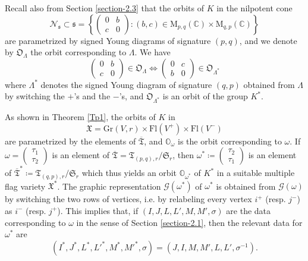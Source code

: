 \documentclass[ALCO,Unicode]{cedram}
\newcommand{\fs}{\mathfrak{s}}
\newcommand{\Mat}{\mathrm{M}}
\newcommand{\Xorbit}{\mathbb{O}}
\newcommand{\Nsorbit}{\mathfrak{O}}
\newcommand{\nilpotentsof}[1]{\mathcal{N}_{#1}}
\newcommand{\permutationsof}[1]{\mathfrak{S}_{#1}}
\newcommand{\ppermutationsof}{\mathfrak{T}}
\newcommand{\parameters}{\overline{\ppermutationsof}}
\newcommand{\Xfv}{\mathfrak{X}}
\newcommand{\Grass}{\mathrm{Gr}}
\newcommand{\Flags}{\mathrm{Fl}}
\newcommand{\mC}{\mathbb{C}}
\begin{document}
Recall also from Section \ref{section-2.3} that the orbits of $K$ in the nilpotent cone
\[
\nilpotentsof{\fs}\subset\fs=\left\{\begin{pmatrix} 0 & b\\ c & 0 \end{pmatrix}: (b,c)\in \Mat_{p,q}(\mC)\times\Mat_{q,p}(\mC)\right\}
\]
are parametrized by signed Young diagrams of signature $(p,q)$, and we denote by $\Nsorbit_\Lambda$ the orbit corresponding to $\Lambda$. We have
\begin{equation}
\label{4.6}
\begin{pmatrix} 0 & b\\ c & 0 \end{pmatrix}\in\Nsorbit_\Lambda\Longleftrightarrow \begin{pmatrix} 0 & c\\ b & 0 \end{pmatrix}\in\Nsorbit_{\Lambda^*}
\end{equation}
where $\Lambda^*$ denotes the signed Young diagram of signature $(q,p)$ obtained from $\Lambda$ by switching the $+$'s and the $-$'s, and $\Nsorbit_{\Lambda^*}$ is an orbit of the group $K^*$.

As shown in Theorem \ref{Tp1}, the orbits of $K$ in
\[
\Xfv=\Grass(V,r)\times\Flags(V^+)\times\Flags(V^-)
\]
are parametrized by the elements of $\parameters$, and
$\Xorbit_\omega$ is the orbit corresponding to $\omega$. If
$\omega=\begin{pmatrix} \tau_1\\ \tau_2 \end{pmatrix}$ is an
element of
$\parameters=\ppermutationsof_{(p,q),r}/\permutationsof{r}$, then
$\omega^*\coloneqq \begin{pmatrix} \tau_2\\ \tau_1 \end{pmatrix}$ is an
element of
$\parameters^*\coloneqq \ppermutationsof_{(q,p),r}/\permutationsof{r}$ which
thus yields an orbit $\Xorbit_{\omega^*}$ of $K^*$ in a suitable
multiple flag variety $\Xfv^*$. The graphic representation
$\mathcal{G}(\omega^*)$ of $\omega^*$ is obtained from
$\mathcal{G}(\omega)$ by switching the two rows of vertices, i.e.
by relabeling every vertex $i^+$ (resp. $j^-$) as $i^-$ (resp.
$j^+$). This implies that, if $(I,J,L,L',M,M',\sigma)$ are the data
corresponding to $\omega$ in the sense of Section \ref{section-2.1},
then the relevant data for $\omega^*$ are
\begin{equation}
\label{4.7}
(I^*,J^*,L^*,L'^*,M^*,M'^*,\sigma)=(J,I,M,M',L,L',\sigma^{-1}).
\end{equation}
\end{document}
